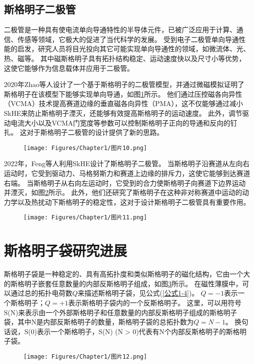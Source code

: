 \subsection{斯格明子二极管}
二极管是一种具有使电流单向导通特性的半导体元件，已被广泛应用于计算、通信、传感等领域，它极大的促进了当代科学的发展。
受到电子二极管单向导通性能的启发，研究人员将目光投向其它可能实现单向导通性的领域，如微流体、光、热、磁等。
其中磁斯格明子具有拓扑结构稳定、运动速度快以及尺寸小等优势，这使它能够作为信息载体并应用于二极管。\par
2020年Zhao等人设计了一个基于斯格明子的二极管模型，并通过微磁模拟证明了斯格明子在该模型下能够实现单向导通，如图\ref{图1.10}所示。
他们通过压控磁各向异性（VCMA）技术提高赛道边缘的垂直磁各向异性（PMA），这不仅能够通过减小SkHE来防止斯格明子湮灭，还能够有效提高斯格明子的运动速度。
此外，调节驱动电流大小以及VCMA门宽度等参数可以控制斯格明子正向的导通和反向的钉扎。
这对于斯格明子二极管的设计提供了新的思路。
\begin{figure}[htb]
    \centering
    \texttt{[image: Figures/Chapter1/图片10.png]}
    \label{图1.10}
\end{figure}\par
2022年，Feng等人利用SkHE设计了斯格明子二极管。
当斯格明子沿赛道从左向右运动时，它受到驱动力、马格努斯力和赛道上边缘的排斥力，这使它能够到达赛道右端。
当斯格明子从右向左运动时，它受到的合力使斯格明子向赛道下边界运动并湮灭，如图\ref{图1.11}所示。
此外，他们还研究了斯格明子在这种非对称赛道中运动的动力学以及热扰动下斯格明子的稳定性，这对于设计斯格明子二极管具有重要作用。
\begin{figure}[H]
    \centering
    \texttt{[image: Figures/Chapter1/图片11.png]}
    \label{图1.11}
\end{figure}
\section{斯格明子袋研究进展}
斯格明子袋是一种稳定的、具有高拓扑度和类似斯格明子的磁化结构，它由一个大的斯格明子嵌套任意数量的内部反斯格明子组成，如图\ref{图1.12}所示。
在磁性薄膜中，可以通过总的拓扑电荷数$Q$来描述斯格明子袋，见公式(\ref{公式1-4})。
$Q = -1$表示一个斯格明子；$Q = +1$表示斯格明子袋内的一个反斯格明子。
这里，可以用符号S(N)来表示由一个外部斯格明子和任意数量的内部反斯格明子组成的斯格明子袋，其中N是内部反斯格明子的数量，斯格明子袋的总拓扑数为$Q = N-1$。
换句话说，S(0)表示一个斯格明子，S(N) (N > 0)代表有N个内部反斯格明子的斯格明子袋。
\begin{figure}[htb]
    \centering
    \texttt{[image: Figures/Chapter1/图片12.png]}
    \label{图1.12}
\end{figure}
